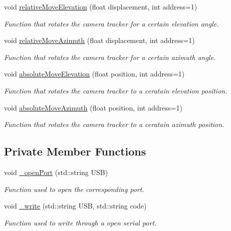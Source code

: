 \begin{DoxyCompactItemize}
void \hyperlink{class_rotation_stage_aeeb1a8db6fe729db66fd7d5712dc8dee}{relative\+Move\+Elevation} (float displacement, int address=1)
\begin{DoxyCompactList}\small\item\em Function that rotates the camera tracker for a certain elevation angle. \end{DoxyCompactList}\item 
void \hyperlink{class_rotation_stage_ab1b65e7f758ef5e865098e1004002a7f}{relative\+Move\+Azimuth} (float displacement, int address=1)
\begin{DoxyCompactList}\small\item\em Function that rotates the camera tracker for a certain azimuth angle. \end{DoxyCompactList}\item 
void \hyperlink{class_rotation_stage_ad51e21e68642e5e23089f431d1242dea}{absolute\+Move\+Elevation} (float position, int address=1)
\begin{DoxyCompactList}\small\item\em Function that rotates the camera tracker to a ceratain elevation position. \end{DoxyCompactList}\item 
void \hyperlink{class_rotation_stage_a71cedba1bf3aba55bc3db7254e83b449}{absolute\+Move\+Azimuth} (float position, int address=1)
\begin{DoxyCompactList}\small\item\em Function that rotates the camera tracker to a ceratain azimuth position. \end{DoxyCompactList}\end{DoxyCompactItemize}
\subsection*{Private Member Functions}
\begin{DoxyCompactItemize}
\item 
void \hyperlink{class_rotation_stage_a8c120bd6de719b9aee263b421850bdaf}{\+\_\+open\+Port} (std\+::string U\+SB)
\begin{DoxyCompactList}\small\item\em Function used to open the corresponding port. \end{DoxyCompactList}\item 
void \hyperlink{class_rotation_stage_afb2393a3cac78176407e8e2d31a6cef4}{\+\_\+write} (std\+::string U\+SB, std\+::string code)
\begin{DoxyCompactList}\small\item\em Function used to write through a open serial port. \end{DoxyCompactList}\end{DoxyCompactItemize}
